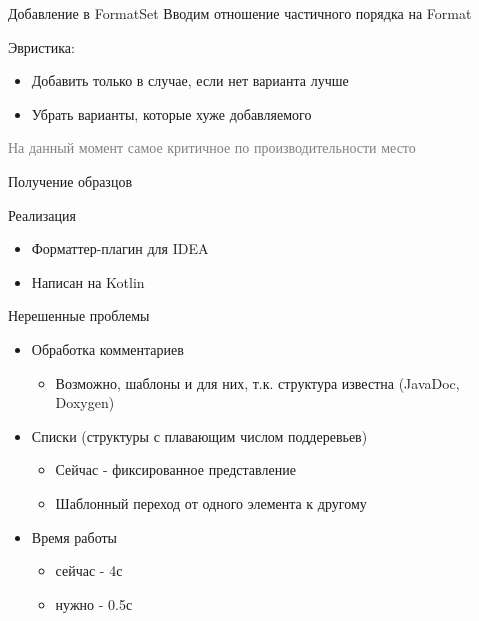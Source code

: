 \documentclass[sans]{beamer}
\begin{document}
\begin{frame}{Добавление в FormatSet}
  Вводим отношение частичного порядка на Format
  \vspace{1cm}

  Эвристика:
  \begin{itemize}
    \item Добавить только в случае, если нет варианта лучше
    \item Убрать варианты, которые хуже добавляемого
  \end{itemize}
  \vspace{1cm}
  \textcolor{gray}{На данный момент самое критичное по производительности место}
\end{frame}

\begin{frame}{Получение образцов}
\end{frame}

\begin{frame}{Реализация}
  \begin{itemize}
    \item Форматтер-плагин для IDEA
    \item Написан на Kotlin
  \end{itemize}
\end{frame}

\begin{frame}{Нерешенные проблемы}
  \begin{itemize}
    \item Обработка комментариев
      \begin{itemize}
        \item Возможно, шаблоны и для них, т.к. структура известна (JavaDoc, Doxygen) 
      \end{itemize}
    \item Списки (структуры с плавающим числом поддеревьев)
      \begin{itemize}
        \item Сейчас - фиксированное представление
        \item Шаблонный переход от одного элемента к другому
      \end{itemize}
    \item Время работы
      \begin{itemize}
        \item сейчас - 4с
        \item нужно  - 0.5с
      \end{itemize}
  \end{itemize}
\end{frame}
\end{document}
